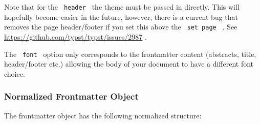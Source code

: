 Note that for the \texttt{\ header\ } the theme must be passed in
directly. This will hopefully become easier in the future, however,
there is a current bug that removes the page header/footer if you set
this above the \texttt{\ set\ page\ } . See
\href{https://github.com/typst/packages/raw/main/packages/preview/pubmatter/0.1.0/\#2987}{https://github.com/typst/typst/issues/2987}
.

The \texttt{\ font\ } option only corresponds to the frontmatter content
(abstracts, title, header/footer etc.) allowing the body of your
document to have a different font choice.

\subsubsection{Normalized Frontmatter
Object}\label{normalized-frontmatter-object}

The frontmatter object has the following normalized structure:

